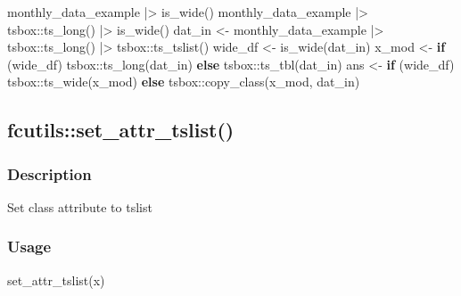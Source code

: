 \documentclass[
  letterpaper,
  DIV=11,
  numbers=noendperiod]{scrreport}
\newenvironment{Shaded}{\begin{snugshade}}{\end{snugshade}}
\newcommand{\ControlFlowTok}[1]{\textcolor[rgb]{0.00,0.23,0.31}{\textbf{#1}}}
\newcommand{\FunctionTok}[1]{\textcolor[rgb]{0.28,0.35,0.67}{#1}}
\newcommand{\NormalTok}[1]{\textcolor[rgb]{0.00,0.23,0.31}{#1}}
\newcommand{\OtherTok}[1]{\textcolor[rgb]{0.00,0.23,0.31}{#1}}
\newcommand{\SpecialCharTok}[1]{\textcolor[rgb]{0.37,0.37,0.37}{#1}}
\begin{document}
\begin{Shaded}
\begin{Highlighting}[]
\NormalTok{monthly\_data\_example }\SpecialCharTok{|\textgreater{}} \FunctionTok{is\_wide}\NormalTok{()}
\NormalTok{monthly\_data\_example }\SpecialCharTok{|\textgreater{}}
\NormalTok{  tsbox}\SpecialCharTok{::}\FunctionTok{ts\_long}\NormalTok{() }\SpecialCharTok{|\textgreater{}}
  \FunctionTok{is\_wide}\NormalTok{()}
\NormalTok{dat\_in }\OtherTok{\textless{}{-}}\NormalTok{ monthly\_data\_example }\SpecialCharTok{|\textgreater{}}
\NormalTok{  tsbox}\SpecialCharTok{::}\FunctionTok{ts\_long}\NormalTok{() }\SpecialCharTok{|\textgreater{}}
\NormalTok{  tsbox}\SpecialCharTok{::}\FunctionTok{ts\_tslist}\NormalTok{()}
\NormalTok{wide\_df }\OtherTok{\textless{}{-}} \FunctionTok{is\_wide}\NormalTok{(dat\_in)}
\NormalTok{x\_mod }\OtherTok{\textless{}{-}} \ControlFlowTok{if}\NormalTok{ (wide\_df) tsbox}\SpecialCharTok{::}\FunctionTok{ts\_long}\NormalTok{(dat\_in) }\ControlFlowTok{else}\NormalTok{ tsbox}\SpecialCharTok{::}\FunctionTok{ts\_tbl}\NormalTok{(dat\_in)}
\NormalTok{ans }\OtherTok{\textless{}{-}} \ControlFlowTok{if}\NormalTok{ (wide\_df) tsbox}\SpecialCharTok{::}\FunctionTok{ts\_wide}\NormalTok{(x\_mod) }\ControlFlowTok{else}\NormalTok{ tsbox}\SpecialCharTok{::}\FunctionTok{copy\_class}\NormalTok{(x\_mod, dat\_in)}
\end{Highlighting}
\end{Shaded}

\subsection{fcutils::set\_attr\_tslist()}\label{fcutilsset_attr_tslist}

\subsubsection{Description}\label{description-54}

Set class attribute to tslist

\subsubsection{Usage}\label{usage-54}

\begin{Shaded}
\begin{Highlighting}[]
\FunctionTok{set\_attr\_tslist}\NormalTok{(x)}
\end{Highlighting}
\end{Shaded}
\end{document}
